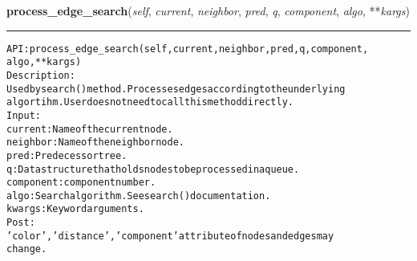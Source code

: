     \label{coinor:gimpy:graph:Graph:process_edge_search}

    \vspace{0.5ex}

\hspace{.8\funcindent}\begin{boxedminipage}{\funcwidth}

    \raggedright \textbf{process\_edge\_search}(\textit{self}, \textit{current}, \textit{neighbor}, \textit{pred}, \textit{q}, \textit{component}, \textit{algo}, **\textit{kargs})

    \vspace{-1.5ex}

    \rule{\textwidth}{0.5\fboxrule}
\setlength{\parskip}{2ex}
\begin{alltt}

API: process\_edge\_search(self, current, neighbor, pred, q, component,
                         algo, **kargs)
Description:
Used by search() method. Processes edges according to the underlying
algortihm. User does not need to call this method directly.
Input:
    current: Name of the current node.
    neighbor: Name of the neighbor node.
    pred: Predecessor tree.
    q: Data structure that holds nodes to be processed in a queue.
    component: component number.
    algo: Search algorithm. See search() documentation.
    kwargs: Keyword arguments.
Post:
    'color', 'distance', 'component' attribute of nodes and edges may
    change.
\end{alltt}

\setlength{\parskip}{1ex}
    \end{boxedminipage}

    \label{coinor:gimpy:graph:Graph:process_node_search}

    \vspace{0.5ex}

